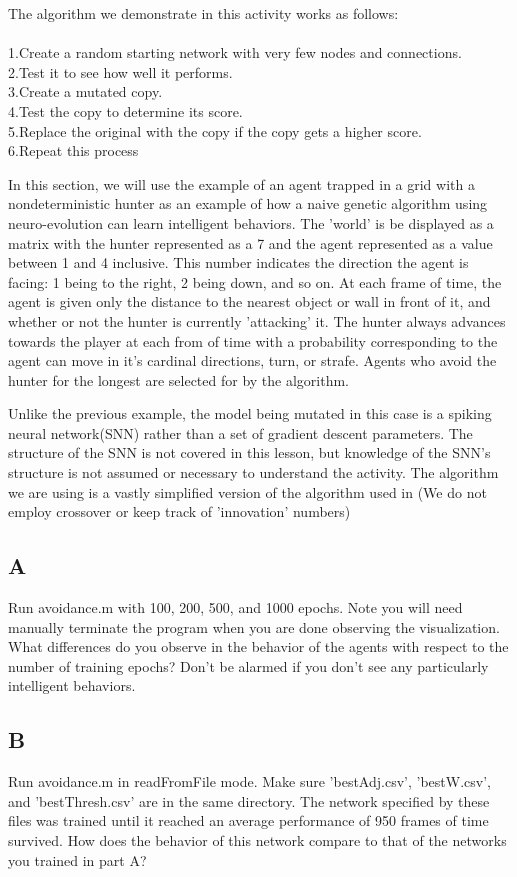 \documentclass[12]{extarticle}
\begin{document}
The algorithm we demonstrate in this activity works as follows: \\
\\
1.Create a random starting network with very few nodes and connections.\\ 
2.Test it to see how well it performs. \\
3.Create a mutated copy. \\
4.Test the copy to determine its score. \\
5.Replace the original with the copy if the copy gets a higher score.\\
6.Repeat this process

In this section, we will use the example of an agent trapped in a grid with a nondeterministic hunter as an example of how a naive genetic algorithm using neuro-evolution can learn intelligent behaviors. The 'world' is be displayed as a matrix with the hunter represented as a 7 and the agent represented as a value between 1 and 4 inclusive. This number indicates the direction the agent is facing: 1 being to the right, 2 being down, and so on. At each frame of time, the agent is given only the distance to the nearest object or wall in front of it, and whether or not the hunter is currently 'attacking' it. The hunter always advances towards the player at each from of time with a probability corresponding to the agent can move in it's cardinal directions, turn, or strafe. Agents who avoid the hunter for the longest are selected for by the algorithm. 

Unlike the previous example, the model being mutated in this case is a spiking neural network(SNN) rather than a set of gradient descent parameters. The structure of the SNN is not covered in this lesson, but knowledge of the SNN's structure is not assumed or necessary to understand the activity. The algorithm we are using is a vastly simplified version of the algorithm used in \cite{Stanley}(We do not employ crossover or keep track of 'innovation' numbers)
\subsection{A}
Run avoidance.m with 100, 200, 500, and 1000 epochs. Note you will need manually terminate the program when you are done observing the visualization.  What differences do you observe in the behavior of the agents with respect to the number of training epochs? Don't be alarmed if you don't see any particularly intelligent behaviors.
\subsection{B}
Run avoidance.m in readFromFile mode. Make sure 'bestAdj.csv', 'bestW.csv', and 'bestThresh.csv' are in the same directory. The network specified by these files was trained until it reached an average performance of 950 frames of time survived. How does the behavior of this network compare to that of the networks you trained in part A?
\end{document}
